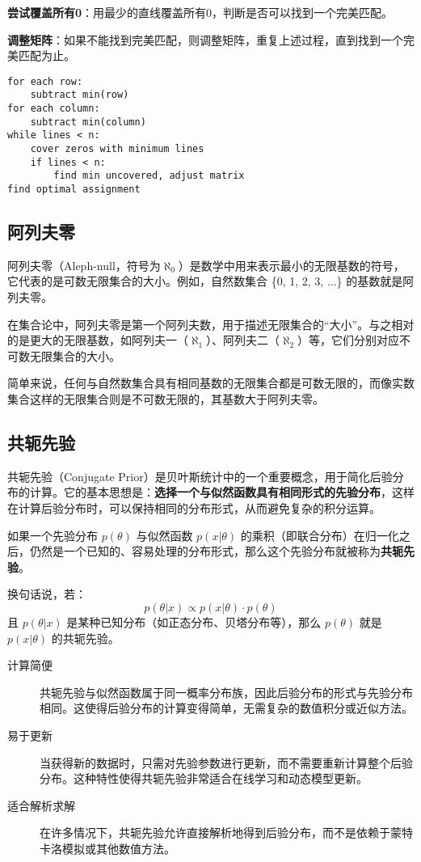 \documentclass{article}
\begin{document}
\textbf{尝试覆盖所有0}：用最少的直线覆盖所有0，判断是否可以找到一个完美匹配。

\textbf{调整矩阵}：如果不能找到完美匹配，则调整矩阵，重复上述过程，直到找到一个完美匹配为止。

\begin{lstlisting}[caption={匈牙利算法伪代码}, label=code:hungarian]
for each row:
    subtract min(row)
for each column:
    subtract min(column)
while lines < n:
    cover zeros with minimum lines
    if lines < n:
        find min uncovered, adjust matrix
find optimal assignment
\end{lstlisting}

\needspace{5cm}
\subsection{阿列夫零}

阿列夫零（Aleph-null，符号为$\aleph_0$）是数学中用来表示最小的无限基数的符号，它代表的是可数无限集合的大小。例如，自然数集合 \{0, 1, 2, 3, ...\} 的基数就是阿列夫零。

在集合论中，阿列夫零是第一个阿列夫数，用于描述无限集合的“大小”。与之相对的是更大的无限基数，如阿列夫一（$\aleph_1$）、阿列夫二（$\aleph_2$）等，它们分别对应不可数无限集合的大小。

简单来说，任何与自然数集合具有相同基数的无限集合都是可数无限的，而像实数集合这样的无限集合则是不可数无限的，其基数大于阿列夫零。

\subsection{共轭先验}
共轭先验（Conjugate Prior）是贝叶斯统计中的一个重要概念，用于简化后验分布的计算。它的基本思想是：\textbf{选择一个与似然函数具有相同形式的先验分布}，这样在计算后验分布时，可以保持相同的分布形式，从而避免复杂的积分运算。

如果一个先验分布 $ p(\theta) $ 与似然函数 $ p(x|\theta) $ 的乘积（即联合分布）在归一化之后，仍然是一个已知的、容易处理的分布形式，那么这个先验分布就被称为\textbf{共轭先验}。

换句话说，若：
$$
p(\theta | x) \propto p(x|\theta) \cdot p(\theta)
$$
且 $ p(\theta | x) $ 是某种已知分布（如正态分布、贝塔分布等），那么 $ p(\theta) $ 就是 $ p(x|\theta) $ 的共轭先验。
\begin{description}
    \item[计算简便] 共轭先验与似然函数属于同一概率分布族，因此后验分布的形式与先验分布相同。这使得后验分布的计算变得简单，无需复杂的数值积分或近似方法。
    \item[易于更新] 当获得新的数据时，只需对先验参数进行更新，而不需要重新计算整个后验分布。这种特性使得共轭先验非常适合在线学习和动态模型更新。
    \item[适合解析求解] 在许多情况下，共轭先验允许直接解析地得到后验分布，而不是依赖于蒙特卡洛模拟或其他数值方法。
\end{description}
\end{document}
